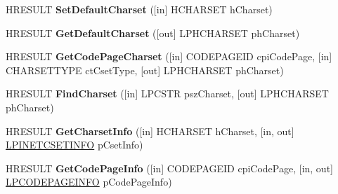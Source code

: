 \begin{DoxyCompactItemize}
\item 
\mbox{\label{interface_m_i_m_e_o_l_e_1_1_i_mime_international_a7c445bf7272a92bdfeff221ab648132e}} 
H\+R\+E\+S\+U\+LT {\bfseries Set\+Default\+Charset} (\mbox{[}in\mbox{]} H\+C\+H\+A\+R\+S\+ET h\+Charset)
\item 
\mbox{\label{interface_m_i_m_e_o_l_e_1_1_i_mime_international_a0bd594e056bfb316c0d25e94d1f8e7b4}} 
H\+R\+E\+S\+U\+LT {\bfseries Get\+Default\+Charset} (\mbox{[}out\mbox{]} L\+P\+H\+C\+H\+A\+R\+S\+ET ph\+Charset)
\item 
\mbox{\label{interface_m_i_m_e_o_l_e_1_1_i_mime_international_a80d81dfdffe165e9bdfd19247b5696a7}} 
H\+R\+E\+S\+U\+LT {\bfseries Get\+Code\+Page\+Charset} (\mbox{[}in\mbox{]} C\+O\+D\+E\+P\+A\+G\+E\+ID cpi\+Code\+Page, \mbox{[}in\mbox{]} C\+H\+A\+R\+S\+E\+T\+T\+Y\+PE ct\+Cset\+Type, \mbox{[}out\mbox{]} L\+P\+H\+C\+H\+A\+R\+S\+ET ph\+Charset)
\item 
\mbox{\label{interface_m_i_m_e_o_l_e_1_1_i_mime_international_aa7b993901def32d26d4f1dbbf0b21309}} 
H\+R\+E\+S\+U\+LT {\bfseries Find\+Charset} (\mbox{[}in\mbox{]} L\+P\+C\+S\+TR psz\+Charset, \mbox{[}out\mbox{]} L\+P\+H\+C\+H\+A\+R\+S\+ET ph\+Charset)
\item 
\mbox{\label{interface_m_i_m_e_o_l_e_1_1_i_mime_international_a9c0b165727aaed0a0f8b4445d32de577}} 
H\+R\+E\+S\+U\+LT {\bfseries Get\+Charset\+Info} (\mbox{[}in\mbox{]} H\+C\+H\+A\+R\+S\+ET h\+Charset, \mbox{[}in, out\mbox{]} \hyperlink{struct_m_i_m_e_o_l_e_1_1_i_mime_international_1_1tag_i_n_e_t_c_s_e_t_i_n_f_o}{L\+P\+I\+N\+E\+T\+C\+S\+E\+T\+I\+N\+FO} p\+Cset\+Info)
\item 
\mbox{\label{interface_m_i_m_e_o_l_e_1_1_i_mime_international_ae1c9aaa3358ebd8488449c4c0bbb6795}} 
H\+R\+E\+S\+U\+LT {\bfseries Get\+Code\+Page\+Info} (\mbox{[}in\mbox{]} C\+O\+D\+E\+P\+A\+G\+E\+ID cpi\+Code\+Page, \mbox{[}in, out\mbox{]} \hyperlink{struct_m_i_m_e_o_l_e_1_1_i_mime_international_1_1tag_c_o_d_e_p_a_g_e_i_n_f_o}{L\+P\+C\+O\+D\+E\+P\+A\+G\+E\+I\+N\+FO} p\+Code\+Page\+Info)

\end{DoxyCompactItemize}
